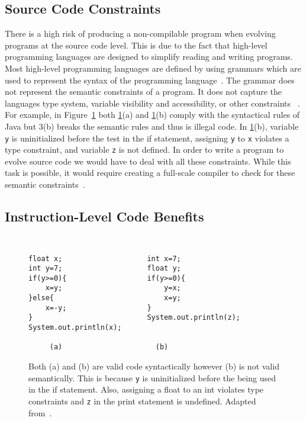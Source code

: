 \documentclass{sig-alternate}
\begin{document}
\subsection{Source Code Constraints}
There is a high risk of producing a non-compilable program when evolving programs at the source code level. This is due to the fact that high-level programming languages are designed to simplify reading and writing programs. Most high-level programming languages are defined by using grammars which are used to represent the syntax of the programming language~\cite{Oracle:2013,Assembly:2010}. The grammar does not represent the semantic constraints of a program. It does not capture the languages type system, variable visibility and accessibility, or other constraints ~\cite{FINCH:2011}. For example, in Figure~\ref{semantics} both \ref{semantics}(a) and \ref{semantics}(b) comply with the syntactical rules of Java but 3(b) breaks the semantic rules and thus is illegal code. In \ref{semantics}(b), variable \texttt{y} is uninitialized before the test in the if statement, assigning \texttt{y} to \texttt{x} violates a type constraint, and variable \texttt{z} is not defined. In order to write a program to evolve source code we would have to deal with all these constraints. While this task is possible, it would require creating a full-scale compiler to check for these semantic constraints~\cite{FINCH:2011}.\par


\subsection{Instruction-Level Code Benefits}
\begin{figure}
\centering
{\tt
\begin{verbatim}
float x;                    int x=7;
int y=7;                    float y;
if(y>=0){                   if(y>=0){
    x=y;                        y=x;
}else{                          x=y;
    x=-y;                   }
}                           System.out.println(z);
System.out.println(x);	
     
     (a)                      (b)

\end{verbatim}
}
\caption{Both (a) and (b) are valid code syntactically however (b) is not valid semantically. This is because \texttt{y} is uninitialized before the being used in the if statement. Also, assigning a float to an int violates type constraints and \texttt{z} in the print statement is undefined. Adapted from~\cite{FINCH:2011}.}
\label{semantics}
\end{figure}
\end{document}
